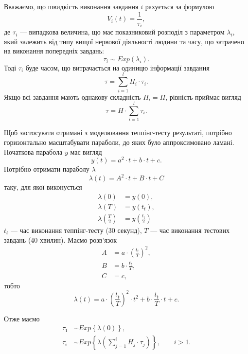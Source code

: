 Вважаємо, що швидкість виконання завдання $i$ рахується за формулою
\begin{equation*}
  V_i\left( t \right) = \frac{1}{\tau_i},
\end{equation*}
де $\tau_i$ --- випадкова величина, що має показниковий розподіл
з параметром $\lambda_i$, який залежить від типу вищої нервової діяльності
людини та часу, що затрачено на виконання попередніх завдань:
\begin{equation*}
  \tau_i \sim Exp\left( \lambda_i \right).
\end{equation*}
Тоді $\tau_i$ буде часом, що витрачається на одиницю інформації
завдання
\begin{equation*}
  \tau = \sum_{i=1}^{l} H_i \cdot \tau_i.
\end{equation*}
Якщо всі завдання мають однакову складність $H_i = H$, рівність приймає вигляд
\begin{equation*}
  \tau = H \cdot \sum_{i=1}^{l} \tau_i.
\end{equation*}

Щоб застосувати отримані з моделювання теппінг-тесту результаті,
потрібно горизонтально масштабувати параболи, до яких було аппроксимовано
ламані.
Початкова парабола $y$ має вигляд
\begin{equation*}
  y \left( t \right) = a^2 \cdot t + b \cdot t + c.
\end{equation*}
Потрібно отримати параболу $\lambda$
\begin{equation*}
  \lambda \left( t \right) = A^2 \cdot t + B \cdot t + C
\end{equation*}
таку, для якої виконується
\begin{equation*}
  \begin{split}
    \lambda\left( 0 \right) &= y\left( 0 \right), \\
    \lambda\left( T \right) &= y\left( t_t \right), \\
    \lambda\left( \frac{T}{2} \right) &= y \left( \frac{t_t}{2} \right)
  \end{split}
\end{equation*}
$t_t$ --- час виконання теппінг-тесту (30 секунд),
$T$ --- час виконання тестових завдань (40 хвилин).
Маємо розв’язок
\begin{equation*}
  \begin{split}
    A &= a \cdot \left( \frac{t_t}{T} \right)^2, \\
    B &= b \cdot \frac{t_t}{T}, \\
    C &= c,
  \end{split}
\end{equation*}
тобто
\begin{equation*}
  \lambda\left( t \right)
  = a \cdot \left( \frac{t_t}{T} \right)^2 \cdot t^2
    + b \cdot \frac{t_t}{T} \cdot t
    + c.
\end{equation*}

Отже маємо
\begin{equation*}
  \begin{split}
    \tau_1 &\sim Exp\left\{ \lambda\left( 0 \right) \right\}, \\
    \tau_i &\sim
      Exp\left\{ \lambda\left( \sum_{j=1}^{i} H_j \cdot \tau_j \right) \right\},
      \qquad i>1.
  \end{split}
\end{equation*}
